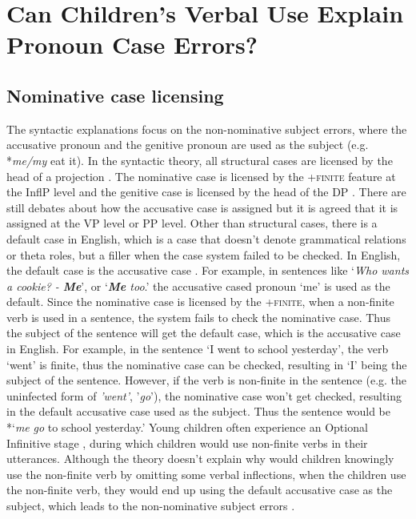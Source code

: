 \section{Can Children's Verbal Use Explain Pronoun Case Errors? }
\subsection{Nominative case licensing}
The syntactic explanations focus on the non-nominative subject errors, where the accusative pronoun and the genitive pronoun are used as the subject (e.g. *\textit{me/my} eat it). In the syntactic theory, all structural cases are licensed by the head of a projection \citep[see][]{chomsky2000minimalist}. The nominative case is licensed by the \textsc{+finite} feature at the InflP level \citep[e.g.][]{haider1985unified, alec1991case} and the genitive case is licensed by the head of the DP \citep[e.g.][]{ritter1991two}. There are still debates about how the accusative case is assigned but it is agreed that it is assigned at the VP level or PP level. Other than structural cases, there is a default case in English, which is a case that doesn't denote grammatical relations or theta roles, but a filler when the case system failed to be checked. In English, the default case is the accusative case \citep{schutze1997, schutze2001}. For example, in sentences like `\textit{Who wants a cookie? - \textbf{Me}}', or `\textit{\textbf{Me} too}.' the accusative cased pronoun `me' is used as the default. Since the nominative case is licensed by the \textsc{+finite}, when a non-finite verb is used in a sentence, the system fails to check the nominative case. Thus the subject of the sentence will get the default case, which is the accusative case in English. For example, in the sentence `I went to school yesterday', the verb `went' is finite, thus the nominative case can be checked, resulting in `I' being the subject of the sentence. However, if the verb is non-finite in the sentence (e.g. the uninfected form of \textit{'went'}, '\textit{go}'), the nominative case won't get checked, resulting in the default accusative case used as the subject. Thus the sentence would be *`\textit{me} \textit{go} to school yesterday.' Young children often experience an Optional Infinitive stage \citep{wexler1994, wexler1998, wexler2000}, during which children would use non-finite verbs in their utterances. Although the theory doesn't explain why would children knowingly use the non-finite verb by omitting some verbal inflections, when the children use the non-finite verb, they would end up using the default accusative case as the subject, which leads to the non-nominative subject errors \citep{schutze1996subject, schutze1997}.  

